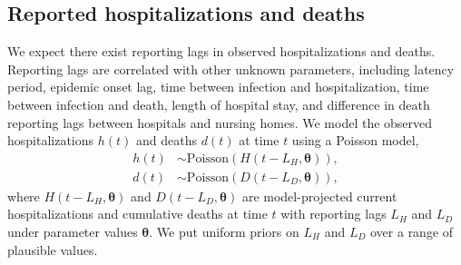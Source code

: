 \documentclass[11pt]{article}
\newcommand{\btheta}{\boldsymbol{\theta}}
\begin{document}



\subsection{Reported hospitalizations and deaths} %

We expect there exist reporting lags in observed hospitalizations and deaths. Reporting lags are correlated with other unknown parameters, including latency period, epidemic onset lag, time between infection and hospitalization, time between infection and death, length of hospital stay, and difference in death reporting lags between hospitals and nursing homes. We model the observed hospitalizations $h(t)$ and deaths $d(t)$ at time $t$ using a Poisson model, 
\begin{align}
h(t) &\sim \mbox{Poisson}(H(t - L_H, \btheta)), \\
d(t) &\sim \mbox{Poisson}(D(t - L_D, \btheta)), 
\end{align}
where $H(t - L_H, \btheta)$ and $D(t - L_D, \btheta)$ are model-projected current hospitalizations and cumulative deaths at time $t$ with reporting lags $L_H$ and $L_D$ under parameter values $\btheta$. We put uniform priors on $L_H$ and $L_D$ over a range of plausible values. 
\end{document}
